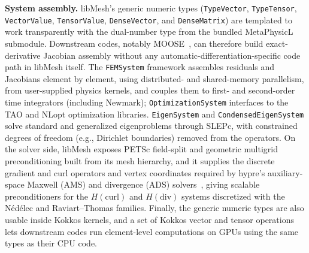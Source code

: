 \documentclass[preprint,12pt, a4paper]{elsarticle}
\begin{document}
\begin{enumerate}
\begin{enumerate}
\textbf{System assembly.} libMesh's generic numeric types (\texttt{TypeVector},
\texttt{TypeTensor}, \texttt{VectorValue}, \texttt{TensorValue}, \texttt{DenseVector}, and
\texttt{DenseMatrix}) are templated to work transparently with the dual-number type from the
bundled MetaPhysicL submodule. Downstream codes, notably MOOSE~\cite{lindsay2021metaphysicl}, can
therefore build exact-derivative Jacobian assembly without any
automatic-differentiation-specific code path in libMesh itself. The \texttt{FEMSystem} framework
assembles residuals and Jacobians element by element, using distributed- and shared-memory parallelism, from
user-supplied physics kernels, and couples them to first- and second-order time integrators
(including Newmark); \texttt{OptimizationSystem} interfaces to the TAO and NLopt optimization
libraries. \texttt{EigenSystem} and \texttt{CondensedEigenSystem} solve standard and generalized
eigenproblems through SLEPc, with constrained degrees of freedom (e.g., Dirichlet boundaries)
removed from the operators. On the solver side, libMesh exposes PETSc field-split and geometric
multigrid preconditioning built from its mesh hierarchy, and it supplies the discrete gradient
and curl operators and vertex coordinates required by hypre's auxiliary-space Maxwell (AMS) and
divergence (ADS) solvers~\cite{kolev2009ams,kolev2012ads}, giving scalable preconditioners for the
$H(\mathrm{curl})$ and $H(\mathrm{div})$ systems discretized with the N\'ed\'elec and
Raviart--Thomas families. Finally, the generic numeric types are also usable inside Kokkos
kernels, and a set of Kokkos vector and tensor operations lets downstream codes run
element-level computations on GPUs using the same types as their CPU code.


\end{enumerate}
\end{enumerate}
\end{document}

